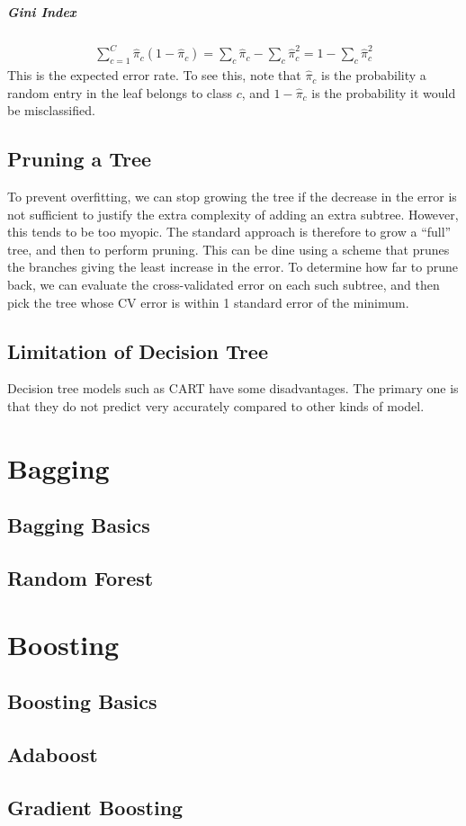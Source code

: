 \subparagraph{Gini Index}

\begin{align*}
	\sum_{c=1}^C\hat{\pi}_c(1-\hat{\pi}_c)=\sum_c\hat{\pi}_c-\sum_c\hat{\pi}_c^2=1-\sum_c\hat{\pi}_c^2
\end{align*}
This is the expected error rate. To see this, note that $\hat{\pi}_c$ is the probability a random entry in the leaf belongs to class $c$, and $1-\hat{\pi}_c$ is the probability it would be misclassified.

\subsection{Pruning a Tree}

To prevent overfitting, we can stop growing the tree if the decrease in the error is not sufficient to justify the extra complexity of adding an extra subtree. However, this tends to be too myopic. The standard approach is therefore to grow a ``full'' tree, and then to perform pruning. This can be dine using a scheme that prunes the branches giving the least increase in the error. To determine how far to prune back, we can evaluate the cross-validated error on each such subtree, and then pick the tree whose CV error is within 1 standard error of the minimum.

\subsection{Limitation of Decision Tree}

Decision tree models such as CART have some disadvantages. The primary one is that they do not predict very accurately compared to other kinds of model.

\section{Bagging}

\subsection{Bagging Basics}

\subsection{Random Forest}

\section{Boosting}

\subsection{Boosting Basics}

\subsection{Adaboost}

\subsection{Gradient Boosting}